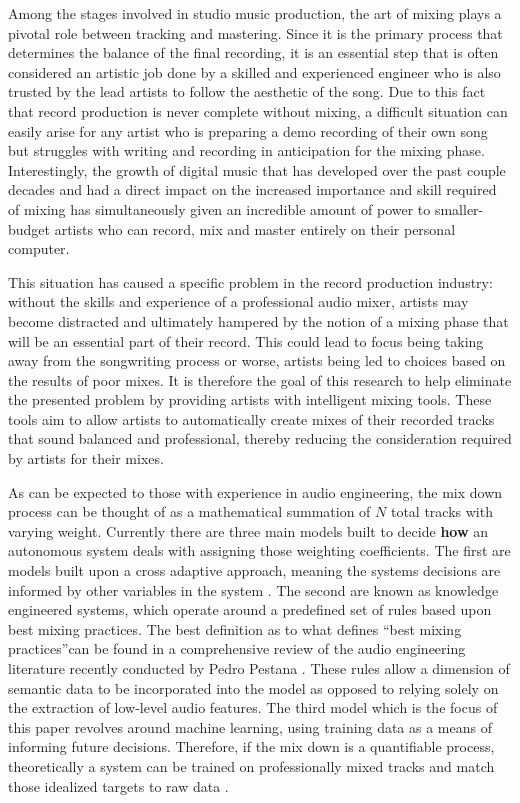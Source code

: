 \documentclass{article}
\begin{document}
Among the stages involved in studio music production, the art of mixing plays a pivotal role between tracking and mastering.  Since it is the primary process that determines the balance of the final recording, it is an essential step that is often considered an artistic job done by a skilled and experienced engineer who is also trusted by the lead artists to follow the aesthetic of the song.  Due to this fact that record production is never complete without mixing, a difficult situation can easily arise for any artist who is preparing a demo recording of their own song but struggles with writing and recording in anticipation for the mixing phase.  Interestingly, the growth of digital music that has developed over the past couple decades and had a direct impact on the increased importance and skill required of mixing has simultaneously given an incredible amount of power to smaller-budget artists who can record, mix and master entirely on their personal computer.  

This situation has caused a specific problem in the record production industry: without the skills and experience of a professional audio mixer, artists may become distracted and ultimately hampered by the notion of a mixing phase that will be an essential part of their record.  This could lead to focus being taking away from the songwriting process or worse, artists being led to choices based on the results of poor mixes.  It is therefore the goal of this research to help eliminate the presented problem by providing artists with intelligent mixing tools.  These tools aim to allow artists to automatically create mixes of their recorded tracks that sound balanced and professional, thereby reducing the consideration required by artists for their mixes.  

As can be expected to those with experience in audio engineering, the mix down process can be thought of as a mathematical summation of $N$ total tracks with varying weight.  Currently there are three main models built to decide \textbf{how} an autonomous system deals with assigning those weighting coefficients.  The first are models built upon a cross adaptive approach, meaning the systems decisions are informed by other variables in the system \cite{mansbridge2012implementation}.  The second are known as knowledge engineered systems, which operate around a predefined set of rules based upon best mixing practices.  The best definition as to what defines ``best mixing practices''can be found in a comprehensive review of the audio engineering literature recently conducted by Pedro Pestana \cite{pestana2013automatic}.  These rules allow a dimension of semantic data to be incorporated into the model as opposed to relying solely on the extraction of low-level audio features.  The third model which is the focus of this paper revolves around machine learning, using training data as a means of informing future decisions.  Therefore, if the mix down is a quantifiable process, theoretically a system can be trained on professionally mixed tracks and match those idealized targets to raw data \cite{scott2011automatic}.
\end{document}
